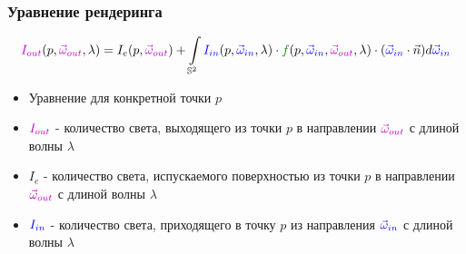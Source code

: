 \documentclass{beamer}
\begin{document}
\begin{frame}[fragile]
\frametitle{Уравнение рендеринга}
\begin{center}
\begin{equation}
{\color{magenta}I_{out}}(p, {\color{magenta}\vec\omega_{out}}, \lambda) = I_{e}(p, {\color{magenta}\vec\omega_{out}})+\int\limits_{\mathbb S^2} {\color{blue}I_{in}}(p, {\color{blue}\vec\omega_{in}}, \lambda) \cdot {\color{green}f}(p, {\color{blue}\vec\omega_{in}}, {\color{magenta}\vec\omega_{out}}, \lambda) \cdot ({\color{blue}\vec\omega_{in}} \cdot \vec{n}) d{\color{blue}\vec\omega_{in}}
\end{equation}
\end{center}
\pause
\begin{itemize}
\item Уравнение для конкретной точки \begin{math}p\end{math}
\pause
\item \begin{math}{\color{magenta}I_{out}}\end{math} - количество света, выходящего из точки \begin{math}p\end{math} в направлении \begin{math}{\color{magenta}\vec\omega_{out}}\end{math} с длиной волны \begin{math}\lambda\end{math}
\pause
\item \begin{math}I_{e}\end{math} - количество света, испускаемого поверхностью из точки \begin{math}p\end{math} в направлении \begin{math}{\color{magenta}\vec\omega_{out}}\end{math} с длиной волны \begin{math}\lambda\end{math}
\pause
\item \begin{math}{\color{blue}I_{in}}\end{math} - количество света, приходящего в точку \begin{math}p\end{math} из направления \begin{math}{\color{blue}\vec\omega_{in}}\end{math} с длиной волны \begin{math}\lambda\end{math}

\end{itemize}
\end{frame}
\end{document}

